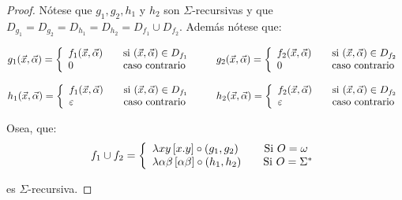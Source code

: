 \begin{proof}
    \PN Nótese que $g_{1}, g_{2}, h_{1}$ y $h_{2}$ son $\Sigma$-recursivas y que $D_{g_{1}} = D_{g_{2}} = D_{h_{1}} =
    D_{h_{2}} = D_{f_{1}} \cup D_{f_{2}}$. Además nótese que:

    \[
      g_{1}(\vec{x},\vec{\alpha}) = \left\{
        \begin{array}{lll}
          f_{1}(\vec{x},\vec{\alpha}) & & \text{si } (\vec{x},\vec{\alpha})\in D_{f_{1}} \\
          0 & & \text{caso contrario}
        \end{array} \right.
      \\ \qquad
      g_{2}(\vec{x},\vec{\alpha}) = \left\{
        \begin{array}{lll}
          f_{2}(\vec{x},\vec{\alpha}) & & \text{si }(\vec{x},\vec{\alpha})\in D_{f_{2}} \\
          0 & & \text{caso contrario}
        \end{array} \right.
    \]

    \[
      h_{1}(\vec{x},\vec{\alpha}) = \left\{
        \begin{array}{lll}
          f_{1}(\vec{x},\vec{\alpha}) & & \text{si } (\vec{x},\vec{\alpha})\in D_{f_{1}} \\
          \varepsilon & & \text{caso contrario}
        \end{array} \right.
      \\ \qquad
      h_{2}(\vec{x},\vec{\alpha}) = \left\{
        \begin{array}{lll}
          f_{2}(\vec{x},\vec{\alpha}) & & \text{si }(\vec{x},\vec{\alpha})\in D_{f_{2}} \\
          \varepsilon & & \text{caso contrario}
        \end{array} \right.
    \]

    \PN Osea, que:
    \[
      f_{1} \cup f_{2} = \left\{
        \begin{array}{lll}
          \lambda xy \left[x.y\right] \circ (g_{1},g_{2}) \qquad\ \text{Si } O = \omega \\
          \lambda \alpha \beta \left[ \alpha \beta \right] \circ (h_{1},h_{2}) \qquad \text{Si } O = \SIGMA
        \end{array} \right.
    \]

    \PN es $\Sigma$-recursiva.
  \end{proof}

